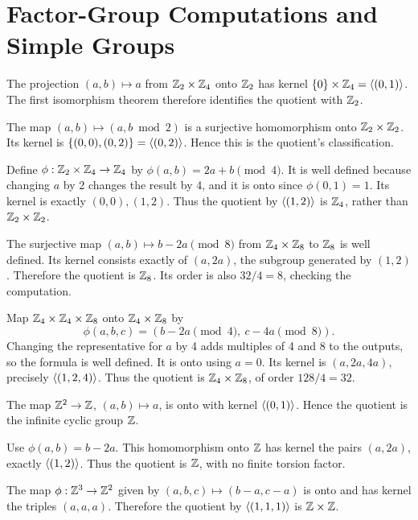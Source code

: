 \section{Factor-Group Computations and Simple Groups}

The projection $(a,b)\mapsto a$ from $\mathbb{Z}_2\times\mathbb{Z}_4$ onto $\mathbb{Z}_2$ has kernel $\{0\}\times\mathbb{Z}_4=\langle (0,1)\rangle$. The first isomorphism theorem therefore identifies the quotient with $\mathbb{Z}_2$.

The map $(a,b)\mapsto(a,b\bmod2)$ is a surjective homomorphism onto $\mathbb{Z}_2\times\mathbb{Z}_2$. Its kernel is $\{(0,0),(0,2)\}=\langle (0,2)\rangle$. Hence this is the quotient's classification.

Define $\phi:\mathbb{Z}_2\times\mathbb{Z}_4\to\mathbb{Z}_4$ by $\phi(a,b)=2a+b\pmod4$. It is well defined because changing $a$ by 2 changes the result by 4, and it is onto since $\phi(0,1)=1$. Its kernel is exactly $(0,0),(1,2)$. Thus the quotient by $\langle (1,2)\rangle$ is $\mathbb{Z}_4$, rather than $\mathbb{Z}_2\times\mathbb{Z}_2$.

The surjective map $(a,b)\mapsto b-2a\pmod8$ from $\mathbb{Z}_4\times\mathbb{Z}_8$ to $\mathbb{Z}_8$ is well defined. Its kernel consists exactly of $(a,2a)$, the subgroup generated by $(1,2)$. Therefore the quotient is $\mathbb{Z}_8$. Its order is also $32/4=8$, checking the computation.

Map $\mathbb{Z}_4\times\mathbb{Z}_4\times\mathbb{Z}_8$ onto $\mathbb{Z}_4\times\mathbb{Z}_8$ by
\[\phi(a,b,c)=(b-2a\pmod4,\ c-4a\pmod8).\]
Changing the representative for $a$ by 4 adds multiples of 4 and 8 to the outputs, so the formula is well defined. It is onto using $a=0$. Its kernel is $(a,2a,4a)$, precisely $\langle (1,2,4)\rangle$. Thus the quotient is $\mathbb{Z}_4\times\mathbb{Z}_8$, of order $128/4=32$.

The map $\mathbb{Z}^2\to\mathbb{Z}$, $(a,b)\mapsto a$, is onto with kernel $\langle (0,1)\rangle$. Hence the quotient is the infinite cyclic group $\mathbb{Z}$.

Use $\phi(a,b)=b-2a$. This homomorphism onto $\mathbb{Z}$ has kernel the pairs $(a,2a)$, exactly $\langle (1,2)\rangle$. Thus the quotient is $\mathbb{Z}$, with no finite torsion factor.

The map $\phi:\mathbb{Z}^3\to\mathbb{Z}^2$ given by $(a,b,c)\mapsto(b-a,c-a)$ is onto and has kernel the triples $(a,a,a)$. Therefore the quotient by $\langle (1,1,1)\rangle$ is $\mathbb{Z}\times\mathbb{Z}$.

